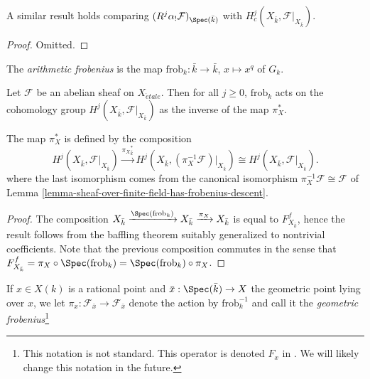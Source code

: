 \noindent
A similar result holds comparing
$(R^j\alpha_!\mathcal{F})_{\Spec(\bar k)}$ with
$H^j_c (X_{\bar k}, \mathcal{F}|_{X_{\bar k}})$.

\begin{proof}
Omitted.
\end{proof}

\begin{definition}
\label{definition-arithmetic-frobenius}
The {\it arithmetic frobenius} is the map
$\text{frob}_k : \bar k \to \bar k$, $x \mapsto x^q$ of $G_k$.
\end{definition}

\begin{theorem}
\label{theorem-geometric-arithmetic-inverse}
Let $\mathcal{F}$ be an abelian sheaf on $X_{\acute{e}tale}$. Then for all
$j\geq 0$, $\text{frob}_k$ acts on the cohomology group $H^j(X_{\bar k},
\mathcal{F}|_{X_{\bar k}})$ as the inverse of the map $\pi_X^*$.
\end{theorem}

\noindent
The map $\pi_X^*$ is defined by the composition
$$
H^j(X_{\bar k}, \mathcal{F}|_{X_{\bar k}}) \xrightarrow{{\pi_X}_{\bar k}^*}
H^j(X_{\bar k}, (\pi_X^{-1} \mathcal{F})|_{X_{\bar k}}) \cong
H^j(X_{\bar k}, \mathcal{F}|_{X_{\bar k}}).
$$
where the last isomorphism comes from the canonical isomorphism
$\pi_X^{-1} \mathcal{F} \cong \mathcal{F}$ of
Lemma \ref{lemma-sheaf-over-finite-field-has-frobenius-descent}.

\begin{proof}
The composition $X_{\bar k} \xrightarrow{\Spec(\text{frob}_k)} X_{\bar k}
\xrightarrow{\pi_X} X_{\bar k}$ is equal to $F_{X_{\bar k}}^f$, hence the
result follows from the baffling theorem suitably generalized to nontrivial
coefficients. Note that the previous composition commutes in the sense that
$F_{X_{\bar k}}^f = \pi_X \circ \Spec(\text{frob}_k) =
\Spec(\text{frob}_k) \circ \pi_X$.
\end{proof}

\begin{definition}
\label{definition-geometric-frobenius-on-stalk}
If $x \in X(k)$ is a rational point and $\bar x : \Spec(\bar k) \to X$
the geometric point lying over $x$, we let $\pi_x : \mathcal{F}_{\bar x} \to
\mathcal{F}_{\bar x}$ denote the action by $\text{frob}_k^{-1}$ and call it the
{\it geometric frobenius}\footnote{This notation is not standard.
This operator is denoted $F_x$ in \cite{SGA4.5}. We will likely change
this notation in the future.}
\end{definition}

